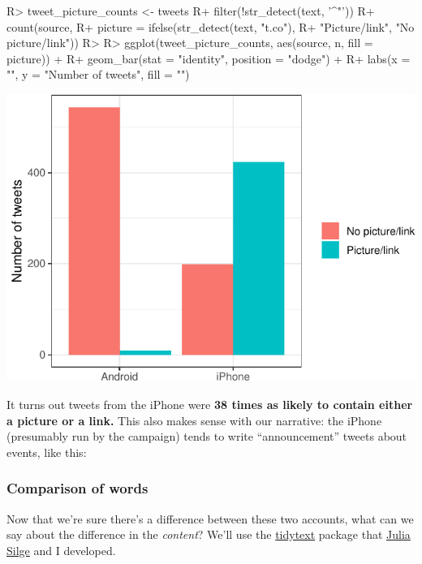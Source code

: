 \documentclass[
]{jss}
\begin{document}
\begin{CodeChunk}

\begin{CodeInput}
R> tweet_picture_counts <- tweets %
R+   filter(!str_detect(text, '^"')) %
R+   count(source,
R+         picture = ifelse(str_detect(text, "t.co"),
R+                          "Picture/link", "No picture/link"))
R> 
R> ggplot(tweet_picture_counts, aes(source, n, fill = picture)) +
R+   geom_bar(stat = "identity", position = "dodge") +
R+   labs(x = "", y = "Number of tweets", fill = "")
\end{CodeInput}


\begin{center}\includegraphics{Live_Demo2_files/figure-latex/unnamed-chunk-4-1} \end{center}

\end{CodeChunk}

It turns out tweets from the iPhone were \textbf{38 times as likely to
contain either a picture or a link.} This also makes sense with our
narrative: the iPhone (presumably run by the campaign) tends to write
``announcement'' tweets about events, like this:

\hypertarget{comparison-of-words}{%
\subsubsection{Comparison of words}\label{comparison-of-words}}

Now that we're sure there's a difference between these two accounts,
what can we say about the difference in the \emph{content}? We'll use
the \href{https://cran.r-project.org/web/packages/tidytext}{tidytext}
package that \href{http://juliasilge.com/}{Julia Silge} and I developed.
\end{document}
